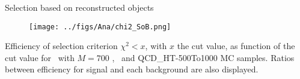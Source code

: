 \begin{frame}{Selection based on reconstructed objects}
\vspace{-.2cm}

\begin{figure}[!Hhtbp]
  \begin{center}
    \texttt{[image: ../figs/Ana/chi2\_SoB.png]}
  \end{center}
\end{figure}

\vspace{-.2cm}
    \begin{block}{}
      \tiny \centering Efficiency of selection criterion $\chi^{2}<x$, with $x$ the cut value, as function of the cut value for \Tp~with $M=700$ \GeVcc, \ttbar~and QCD\_HT-500To1000 MC samples. Ratios between efficiency for signal and each background are also displayed.
    \end{block}

\end{frame}

